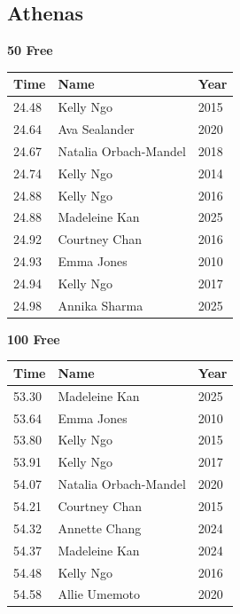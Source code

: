 \subsection{Athenas}
\vspace{1.2em}
\noindent\begin{minipage}[t]{0.48\textwidth}
\centering
\textbf{\textcolor{teamprimary}{50 Free}}\par
\vspace{0.5em}
\centering
\small
\renewcommand{\arraystretch}{1.0}
\setlength{\tabcolsep}{4pt}
\begin{tabular}{@{}p{1.8cm}p{3.0cm}p{1.0cm}@{}}
\toprule
\textbf{Time} & \textbf{Name} & \textbf{Year} \\
\midrule
24.48 & Kelly Ngo & 2015 \\
24.64 & Ava Sealander & 2020 \\
24.67 & Natalia Orbach-Mandel & 2018 \\
24.74 & Kelly Ngo & 2014 \\
24.88 & Kelly Ngo & 2016 \\
24.88 & Madeleine Kan & 2025 \\
24.92 & Courtney Chan & 2016 \\
24.93 & Emma Jones & 2010 \\
24.94 & Kelly Ngo & 2017 \\
24.98 & Annika Sharma & 2025 \\
\bottomrule
\end{tabular}
\end{minipage}
\hfill
\begin{minipage}[t]{0.48\textwidth}
\centering
\textbf{\textcolor{teamprimary}{100 Free}}\par
\vspace{0.5em}
\centering
\small
\renewcommand{\arraystretch}{1.0}
\setlength{\tabcolsep}{4pt}
\begin{tabular}{@{}p{1.8cm}p{3.0cm}p{1.0cm}@{}}
\toprule
\textbf{Time} & \textbf{Name} & \textbf{Year} \\
\midrule
53.30 & Madeleine Kan & 2025 \\
53.64 & Emma Jones & 2010 \\
53.80 & Kelly Ngo & 2015 \\
53.91 & Kelly Ngo & 2017 \\
54.07 & Natalia Orbach-Mandel & 2020 \\
54.21 & Courtney Chan & 2015 \\
54.32 & Annette Chang & 2024 \\
54.37 & Madeleine Kan & 2024 \\
54.48 & Kelly Ngo & 2016 \\
54.58 & Allie Umemoto & 2020 \\
\bottomrule
\end{tabular}
\end{minipage}

